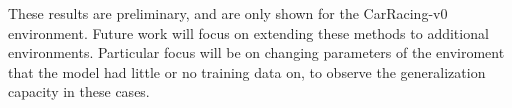 \documentclass{article}
\begin{document}
These results are preliminary, and are only shown for the CarRacing-v0
environment. Future work will focus on extending these methods to
additional environments. Particular focus will be on changing
parameters of the enviroment that the model had little or no training
data on, to observe the generalization capacity in these cases. 








\end{document}
